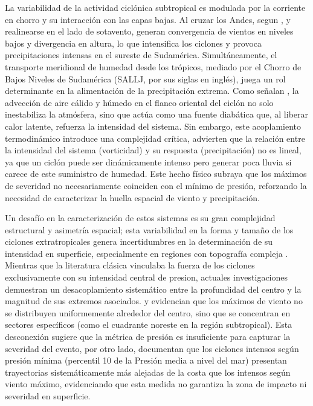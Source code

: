 La variabilidad de la actividad ciclónica subtropical es modulada por la corriente en chorro y su interacción con las capas bajas. Al cruzar los Andes, segun \citet{vera2002cold}, y realinearse en el lado de sotavento, generan convergencia de vientos en niveles bajos y divergencia en altura, lo que intensifica los ciclones y provoca precipitaciones intensas en el sureste de Sudamérica. Simultáneamente, el transporte meridional de humedad desde los trópicos, mediado por el Chorro de Bajos Niveles de Sudamérica (SALLJ, por sus siglas en inglés), juega un rol determinante en la alimentación de la precipitación extrema. Como señalan \citet{reboita2022from}, la advección de aire cálido y húmedo en el flanco oriental del ciclón no solo inestabiliza la atmósfera, sino que actúa como una fuente diabática que, al liberar calor latente, refuerza la intensidad del sistema. Sin embargo, este acoplamiento termodinámico introduce una complejidad crítica, \citet{sinclair2023relationship} advierten que la relación entre la intensidad del sistema (vorticidad) y su respuesta (precipitación) no es lineal, ya que un ciclón puede ser dinámicamente intenso pero generar poca lluvia si carece de este suministro de humedad. Este hecho físico subraya que los máximos de severidad no necesariamente coinciden con el mínimo de presión, reforzando la necesidad de caracterizar la huella espacial de viento y precipitación.


Un desafío en la caracterización de estos sistemas es su gran complejidad estructural y asimetría espacial; esta variabilidad en la forma y tamaño de los ciclones extratropicales genera incertidumbres en la determinación de su intensidad en superficie, especialmente en regiones con topografía compleja \citep{neu2013intercomparison}. Mientras que la literatura clásica vinculaba la fuerza de los ciclones exclusivamente con su intensidad central de presion, actuales investigaciones demuestran un desacoplamiento sistemático entre la profundidad del centro y la magnitud de sus extremos asociados. \citet{bitencourt2010relating} y \citet{cardoso2022synoptic} evidencian que los máximos de viento no se distribuyen uniformemente alrededor del centro, sino que se concentran en sectores específicos (como el cuadrante noreste en la región subtropical). Esta desconexión sugiere que la métrica de presión es insuficiente para capturar la severidad del evento, por otro lado, \citet{cardoso2022synoptic} documentan que los ciclones intensos según presión mínima (percentil 10 de la Presión media a nivel del mar) presentan trayectorias sistemáticamente más alejadas de la costa que los intensos según viento máximo, evidenciando que esta medida no garantiza la zona de impacto ni severidad en superficie.

